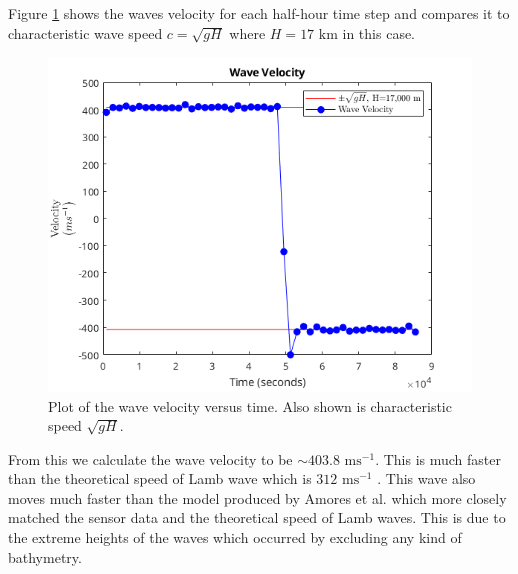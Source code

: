 \documentclass[twoside]{bsu-ms}
\begin{document}
Figure \ref{fig:3.5} shows the waves velocity for each half-hour time step and compares it to characteristic wave speed $c=\sqrt{gH}$ where $H=17$ $\mathrm{km}$ in this case.
\begin{figure}[!htbp]
    \centering
    \includegraphics[width=\textwidth]{images/wavevelocity.png}
    \caption{Plot of the wave velocity versus time. Also shown is characteristic speed $\sqrt{g H}$. }
    \label{fig:3.5}
\end{figure}
From this we calculate the wave velocity to be $\sim403.8$ $\mathrm{ms}^{-1}$. This is much faster than the theoretical speed of Lamb wave which is $312$ $\mathrm{ms}^{-1}$ \cite{bretherton1969lamb}. This wave also moves much faster than the model produced by Amores et al. \cite{amores2022numerical} which more closely matched the sensor data and the theoretical speed of Lamb waves. This is due to the extreme heights of the waves which occurred by excluding any kind of bathymetry.
%
%
\end{document}
